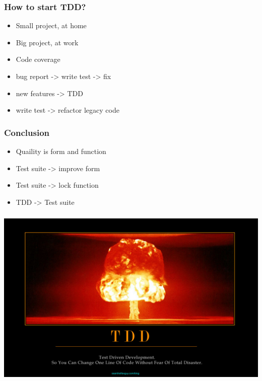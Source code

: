 \begin{frame}
  \frametitle{How to start TDD?}
  \pause
  \begin{itemize}
      \item Small project, at home\pause
      \item Big project, at work\pause
      \item Code coverage\pause
      \item bug report -> write test -> fix\pause
      \item new features -> TDD\pause
      \item write test -> refactor legacy code
  \end{itemize}
\end{frame}

\begin{frame}
  \frametitle{Conclusion}
  \begin{itemize}
      \item Quaility is form and function\pause
      \item Test suite -> improve form\pause
      \item Test suite -> lock function\pause
      \item TDD -> Test suite
  \end{itemize}
\end{frame}

\vspace*{-12.5mm}    
\begin{frame}
\frametitle{}
\hspace*{-11mm}
\includegraphics[width=\paperwidth, width=\paperwidth]{tdd.jpg}
\end{frame}

